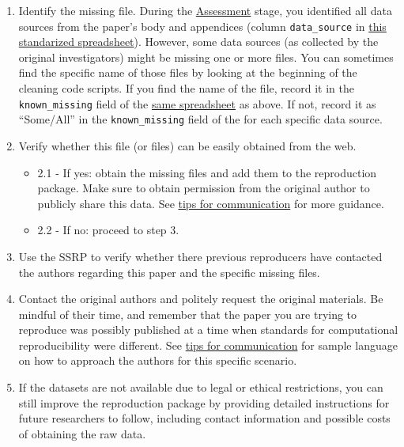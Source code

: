 \documentclass[]{book}
\providecommand{\tightlist}{%
  \setlength{\itemsep}{0pt}\setlength{\parskip}{0pt}}
\begin{document}
\begin{enumerate}
\def\labelenumi{\arabic{enumi}.}
\tightlist
\item
  Identify the missing file. During the \protect\hyperlink{assessment}{Assessment} stage, you identified all data sources from the paper's body and appendices (column \texttt{data\_source} in \href{https://docs.google.com/spreadsheets/d/1LUIdVFH0OfR70C7z07TYeE-uWzKI_JIeWUMaYhqEKK0/edit\#gid=0\&range=A1}{this standarized spreadsheet}). However, some data sources (as collected by the original investigators) might be missing one or more files. You can sometimes find the specific name of those files by looking at the beginning of the cleaning code scripts. If you find the name of the file, record it in the \texttt{known\_missing} field of the \href{https://docs.google.com/spreadsheets/d/1LUIdVFH0OfR70C7z07TYeE-uWzKI_JIeWUMaYhqEKK0/edit\#gid=0\&range=A1}{same spreadsheet} as above. If not, record it as ``Some/All'' in the \texttt{known\_missing} field of the for each specific data source.\\
\item
  Verify whether this file (or files) can be easily obtained from the web.

  \begin{itemize}
  \tightlist
  \item
    2.1 - If yes: obtain the missing files and add them to the reproduction package. Make sure to obtain permission from the original author to publicly share this data. See \href{https://bitss.github.io/ACRE/guidance-for-a-constructive-exchange-between-reproducers-and-original-authors.html}{tips for communication} for more guidance.\\
  \item
    2.2 - If no: proceed to step 3.\\
  \end{itemize}
\item
  Use the SSRP to verify whether there previous reproducers have contacted the authors regarding this paper and the specific missing files.\\
\item
  Contact the original authors and politely request the original materials. Be mindful of their time, and remember that the paper you are trying to reproduce was possibly published at a time when standards for computational reproducibility were different. See \href{https://bitss.github.io/ACRE/guidance-for-a-constructive-exchange-between-reproducers-and-original-authors.html}{tips for communication} for sample language on how to approach the authors for this specific scenario.\\
\item
  If the datasets are not available due to legal or ethical restrictions, you can still improve the reproduction package by providing detailed instructions for future researchers to follow, including contact information and possible costs of obtaining the raw data.
\end{enumerate}
\end{document}
